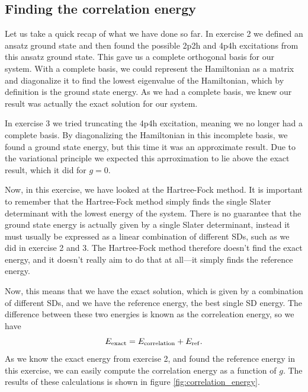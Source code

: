 \documentclass[a4paper, 11pt, notitlepage, english]{article}
\begin{document}
\subsection*{Finding the correlation energy}

Let us take a quick recap of what we have done so far. In exercise 2 we defined an ansatz ground state and then found the possible 2p2h and 4p4h excitations from this ansatz ground state. This gave us a complete orthogonal basis for our system. With a complete basis, we could represent the Hamiltonian as a matrix and diagonalize it to find the lowest eigenvalue of the Hamiltonian, which by definition is the ground state energy. As we had a complete basis, we knew our result was actually the exact solution for our system. 

In exercise 3 we tried truncating the 4p4h excitation, meaning we no longer had a complete basis. By diagonalizing the Hamiltonian in this incomplete basis, we found a ground state energy, but this time it was an approximate result. Due to the variational principle we expected this aprroximation to lie above the exact result, which it did for $g=0$.

Now, in this exercise, we have looked at the Hartree-Fock method. It is important to remember that the Hartree-Fock method simply finds the single Slater determinant with the lowest energy of the system. There is no guarantee that the ground state energy is actually given by a single Slater determinant, instead it must usually be expressed as a linear combination of different SDs, such as we did in exercise 2 and 3. The Hartree-Fock method therefore doesn't find the exact energy, and it doesn't really aim to do that at all---it simply finds the reference energy.

Now, this means that we have the exact solution, which is given by a combination of different SDs, and we have the reference energy, the best single SD energy. The difference between these two energies is known as the correleation energy, so we have
$$E_{\rm exact} = E_{\rm correlation} + E_{\rm ref}.$$
As we know the exact energy from exercise 2, and found the reference energy in this exercise, we can easily compute the correlation energy as a function of $g$. The results of these calculations is shown in figure \ref{fig:correlation_energy}.
\end{document}
